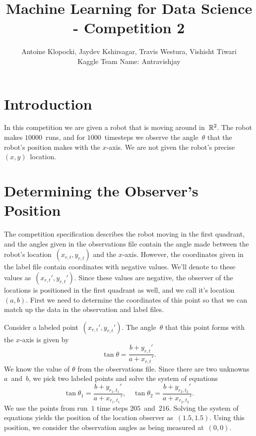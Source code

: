\documentclass[twoside]{article}
\title{Machine Learning for Data Science - Competition 2}
\author{Antoine Klopocki, Jaydev Kshirsagar, Travis Westura, Vishisht Tiwari\\Kaggle Team Name: Antravishjay}
\date{\vspace{-5ex}} %
\begin{document}
\maketitle
\thispagestyle{empty}

\section{Introduction}\label{sec:introduction}

In this competition we are given a robot that is moving around in~$\mathbb{R}^2$.
The robot makes $\num{10000}$~runs, and for $\num{1000}$~timesteps we observe the angle~$\theta$ that the robot's position makes with the $x$-axis.
We are not given the robot's precise ${(x, y)}$~location.

\section{Determining the Observer's Position}\label{sec:determ-observ-posit}

The competition specification describes the robot moving in the first quadrant, and the angles given in the observations file contain the angle made between the robot's location~${(x_{r, t}, y_{r, t})}$ and the $x$-axis.
However, the coordinates given in the label file contain coordinates with negative values.
We'll denote to these values as~${(x_{r, t}', y_{r, t}')}$.
Since these values are negative, the observer of the locations is positioned in the first quadrant as well, and we call it's location~${(a, b)}$.
First we need to determine the coordinates of this point so that we can match up the data in the observation and label files.

Consider a labeled point~${(x_{r, t}', y_{r, t}')}$.
The angle~$\theta$ that this point forms with the $x$-axis is given by
\begin{equation*}
  \tan\theta = \frac{b + y_{r, t}'}{a + x_{r, t}'}.
\end{equation*}
We know the value of $\theta$ from the observations file.
Since there are two unknowns $a$~and~$b$, we pick two labeled points and solve the system of equations
\begin{equation*}
  \tan\theta_1 = \frac{b + y_{r_1, t_1}'}{a + x_{r_1, t_1}'}, \quad \tan\theta_2 = \frac{b + y_{r_2, t_2}'}{a + x_{r_2, t_2}'}.
\end{equation*}
We use the points from run~$1$ time steps $205$~and~$216$.
Solving the system of equations yields the position of the location observer as~$(1.5, 1.5)$.
Using this position, we consider the observation angles as being measured at~$(0, 0)$.
\end{document}
